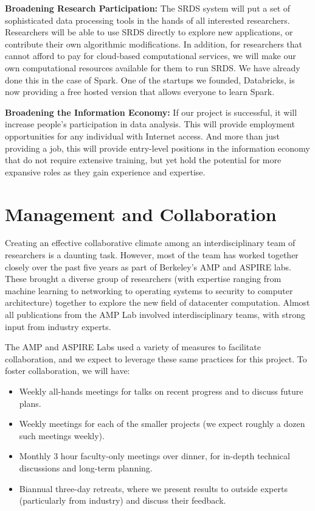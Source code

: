 {\bf Broadening Research Participation:} The SRDS system will put a set of sophisticated data processing tools in the hands of all interested researchers.  Researchers will be able to use SRDS directly to explore new applications, or contribute their own algorithmic modifications.  In addition, for researchers that cannot afford to pay for cloud-based computational services, we will make our own computational resources available for them to run SRDS. We have already done this in the case of Spark. One of the startups we founded, Databricks, is now providing a free hosted version that allows everyone to learn Spark.

{\bf Broadening the Information Economy:} If our project is successful, it will increase people's participation in data analysis.  This will provide employment opportunities for any individual with Internet access.  And more than just providing a job, this will provide entry-level positions in the information economy that do not require extensive training, but yet hold the potential for more expansive roles as they gain experience and expertise.  

\section{Management and Collaboration}

Creating an effective collaborative climate among an interdisciplinary team of researchers is a daunting task. However, most of the team has worked together closely over the past five years as part of Berkeley's AMP and ASPIRE labs.  These brought a diverse group of researchers (with expertise ranging from machine learning to networking to operating systems to security to computer architecture) together to explore the new field of datacenter computation. Almost all publications from the AMP Lab involved interdisciplinary teams, with strong input from industry experts.

The AMP and ASPIRE Labs used a variety of measures to facilitate collaboration, and we expect to leverage these same practices for this project.   To foster collaboration, we will have:

\begin{itemize}[noitemsep,topsep=0pt,parsep=0pt,partopsep=0pt]
\item Weekly all-hands meetings for talks on recent progress and to discuss future plans.
\item  Weekly meetings for each of the smaller projects (we expect roughly a dozen such meetings weekly).
\item  Monthly 3 hour faculty-only meetings over dinner, for in-depth technical discussions and long-term planning.
\item  Biannual three-day retreats, where we present results to outside experts (particularly from industry) and discuss their feedback.
\end{itemize}

